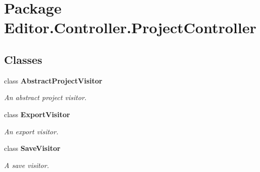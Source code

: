 \section{Package Editor.\-Controller.\-Project\-Controller}
\label{namespace_editor_1_1_controller_1_1_project_controller}
\subsection*{Classes}
\begin{DoxyCompactItemize}
\item 
class {\bf Abstract\-Project\-Visitor}
\begin{DoxyCompactList}\small\item\em An abstract project visitor. \end{DoxyCompactList}\item 
class {\bf Export\-Visitor}
\begin{DoxyCompactList}\small\item\em An export visitor. \end{DoxyCompactList}\item 
class {\bf Save\-Visitor}
\begin{DoxyCompactList}\small\item\em A save visitor. \end{DoxyCompactList}\end{DoxyCompactItemize}
